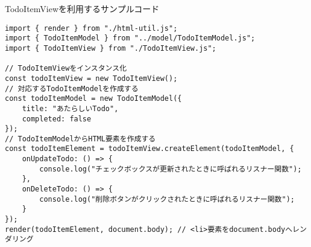 \begin{listtitle}
TodoItemViewを利用するサンプルコード
\end{listtitle}
\begin{lstlisting}
import { render } from "./html-util.js";
import { TodoItemModel } from "../model/TodoItemModel.js";
import { TodoItemView } from "./TodoItemView.js";

// TodoItemViewをインスタンス化
const todoItemView = new TodoItemView();
// 対応するTodoItemModelを作成する
const todoItemModel = new TodoItemModel({
    title: "あたらしいTodo",
    completed: false
});
// TodoItemModelからHTML要素を作成する
const todoItemElement = todoItemView.createElement(todoItemModel, {
    onUpdateTodo: () => {
        console.log("チェックボックスが更新されたときに呼ばれるリスナー関数");
    },
    onDeleteTodo: () => {
        console.log("削除ボタンがクリックされたときに呼ばれるリスナー関数");
    }
});
render(todoItemElement, document.body); // <li>要素をdocument.bodyへレンダリング
\end{lstlisting}
\listend
